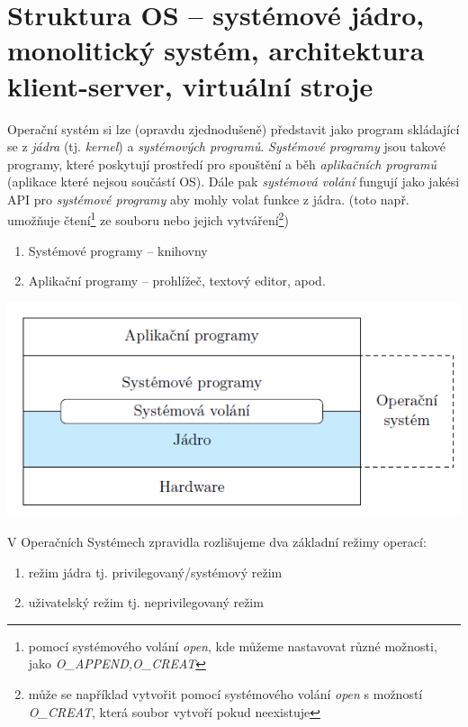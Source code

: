 
\section{Struktura OS – systémové jádro, monolitický systém, architektura klient-server, virtuální stroje} \label{kernel}

Operační systém si lze (opravdu zjednodušeně) představit jako program skládající se z \textit{jádra} (tj. \textit{kernel}) a \textit{systémových programů}. \textit{Systémové programy} jsou takové programy, které poskytují prostředí pro spouštění a běh \textit{aplikačních programů} (aplikace které nejsou součástí OS). Dále pak  \textit{systémová volání} fungují jako jakési API pro \textit{systémové programy} aby mohly volat funkce z jádra. (toto např. umožňuje čtení\footnote{pomocí systémového volání \textit{open}, kde můžeme nastavovat různé možnosti, jako \textit{O\_APPEND,O\_CREAT}} ze souboru nebo jejich vytváření\footnote{může se například vytvořit pomocí systémového volání \textit{open} s možností \textit{O\_CREAT}, která soubor vytvoří pokud neexistuje})

\begin{enumerate}
    \item Systémové programy -- knihovny
    \item Aplikační programy -- prohlížeč, textový editor, apod. 
\end{enumerate}
    
\begin{center}
    \includegraphics[scale=1]{images/OS_kernel_apps.png}
\end{center}

V Operačních Systémech zpravidla rozlišujeme dva základní režimy operací:

\begin{enumerate}
    \item režim jádra tj. privilegovaný/systémový režim
    \item uživatelský režim tj. neprivilegovaný režim
\end{enumerate}

